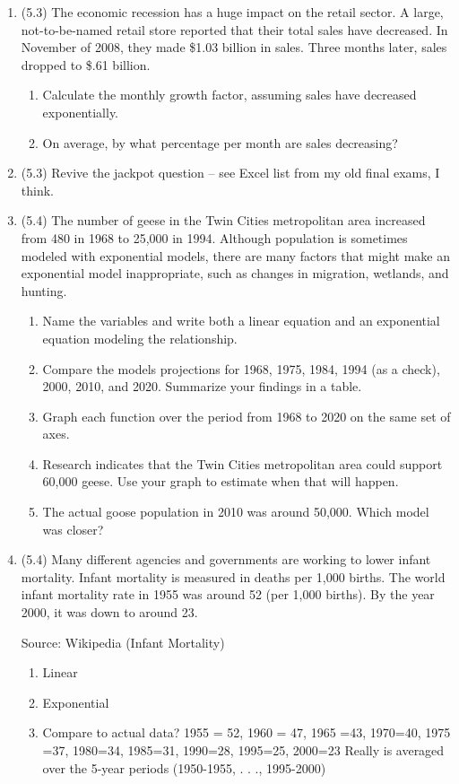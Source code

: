 \documentclass[12pt]{article}
\begin{document}
\begin{enumerate}
\item  (5.3) The economic recession has a huge impact on the retail sector.  A large, not-to-be-named retail store reported that their total sales have decreased.  In November of 2008, they made \$1.03 billion in sales.  Three months later, sales dropped to \$.61 billion.
\begin{enumerate}
\item Calculate the monthly growth factor, assuming sales have decreased exponentially.
\item On average, by what percentage per month are sales decreasing?
\end{enumerate}

\item (5.3) Revive the jackpot question -- see Excel list from my old final exams, I think.


\item (5.4) The number of geese in the Twin Cities metropolitan area increased from 480 in 1968 to 25,000 in 1994.  Although population is sometimes modeled with exponential models, there are many factors that might make an exponential model inappropriate, such as changes in migration, wetlands, and hunting.
\begin{enumerate}
\item Name the variables and write both a linear equation and an exponential equation modeling the relationship.
\item Compare the models projections for 1968, 1975, 1984, 1994 (as a check), 2000, 2010, and 2020.  Summarize your findings in a table.
\item Graph each function over the period from 1968 to 2020 on the same set of axes.
\item Research indicates that the Twin Cities metropolitan area could support 60,000 geese.  Use your graph to estimate when that will happen.
\item The actual goose population in 2010 was around 50,000.  Which model was closer?
\end{enumerate}  %

\item (5.4) Many different agencies and governments are working to lower infant mortality.  Infant mortality is measured in deaths per 1,000 births.  The world infant mortality rate in 1955 was around 52 (per 1,000 births).  By the year 2000, it was down to around 23.
\hfill \begin{footnotesize}  Source: Wikipedia (Infant Mortality) \end{footnotesize}
\begin{enumerate}
\item Linear
\item Exponential
\item Compare to actual data?  1955 = 52, 1960 = 47, 1965 =43, 1970=40, 1975 =37, 1980=34, 1985=31, 1990=28, 1995=25, 2000=23 Really is averaged over the 5-year periods (1950-1955, . . ., 1995-2000)
\end{enumerate}


\end{enumerate}
\end{document}
